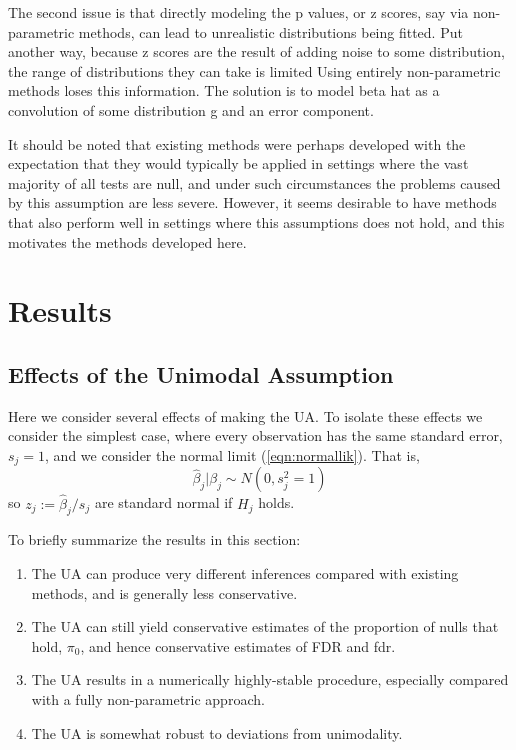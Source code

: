 \documentclass[11pt]{article}
\def\bhat{\hat{\beta}}
\begin{document}
The second issue is that directly modeling the p values, or z scores, say via non-parametric methods, 
can lead to unrealistic distributions being fitted. Put another way, because z scores are the result of adding noise to some
distribution, the range of distributions they can take is limited Using entirely non-parametric methods loses this information.
The solution is to model beta hat as a convolution of some distribution g and an error component.


It should be noted that existing methods were perhaps developed with the expectation that they would typically 
be applied in settings where the vast majority of all tests are null, and under such circumstances
the problems caused by this assumption are less severe. However, it seems desirable to have methods that
also perform well in settings where  this assumptions does not hold, and this motivates the methods developed here.




\section*{Results}


\subsection*{Effects of the Unimodal Assumption}


Here we consider several effects of making the UA. To isolate these effects we consider the simplest case, where every observation has the same
standard error, $s_j=1$, and we consider the normal limit (\ref{eqn:normallik}). That
is,
\begin{equation} \label{eqn:bhatgivenbz}
\bhat_j | \beta_j \sim N(0,s^2_j=1)
\end{equation}
so $z_j:=\bhat_j/s_j$ are standard normal if $H_j$ holds.

To briefly summarize the results in this section:
\begin{enumerate}
\item The UA can produce very different inferences compared with existing methods, and is generally less conservative.
\item The UA can still yield conservative estimates of the proportion of nulls that hold, $\pi_0$, and hence conservative estimates of FDR and fdr.
\item The UA results in a numerically highly-stable procedure, especially compared with a fully non-parametric approach.
\item The UA is somewhat robust to deviations from unimodality.
\end{enumerate}
\end{document}
